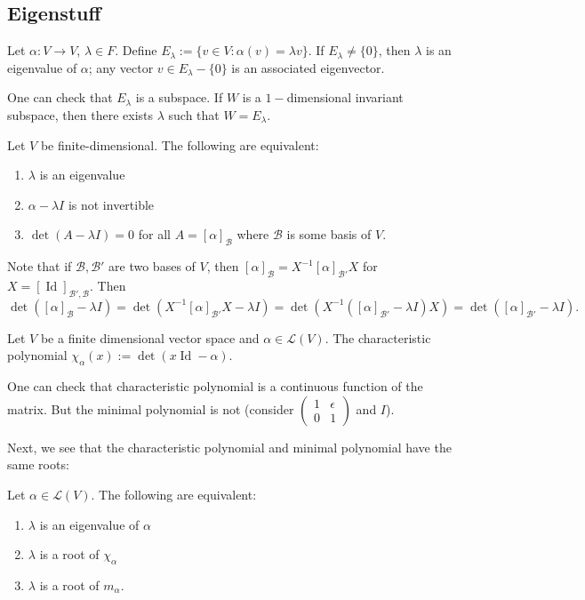 \documentclass{scrartcl}
\def\L{\mathcal{L}}
\def\B{\mathcal{B}}
\DeclareMathOperator{\id}{Id}
\begin{document}
\subsection{Eigenstuff}
\begin{definition}
	Let $\alpha: V \to V$, $\lambda \in F$. Define $E_\lambda := \{v \in V: \alpha(v) = \lambda v\}$. If $E_\lambda \ne \{0\}$, then $\lambda$ is an eigenvalue of $\alpha$; any vector $v \in E_\lambda-\{0\}$ is an associated eigenvector.
\end{definition}
One can check that $E_\lambda$ is a subspace. If $W$ is a $1-$dimensional invariant subspace, then there exists $\lambda$ such that $W = E_\lambda$. 
\begin{theorem}
	Let $V$ be finite-dimensional. The following are equivalent: 
	\begin{enumerate}
		\item $\lambda$ is an eigenvalue
		\item $\alpha - \lambda I$ is not invertible
		\item $\det(A-\lambda I) = 0$ for all $A = [\alpha]_\B$ where $\B$ is some basis of $V$.
	\end{enumerate}
\end{theorem}
\begin{remark}
	Note that if $\B, \B'$ are two bases of $V$, then $[\alpha]_\B = X^{-1}[\alpha]_{\B'}X$ for $X = [\id]_{\B', \B}$. Then
	\[\det([\alpha]_\B-\lambda I) = \det(X^{-1}[\alpha]_{\B'}X-\lambda I) =  \det(X^{-1}([\alpha]_{\B'}-\lambda I)X) = \det([\alpha]_{\B'}-\lambda I).\]%
\end{remark}
\begin{definition}
	Let $V$ be a finite dimensional vector space and $\alpha \in \L(V)$. The characteristic polynomial $\chi_\alpha(x) := \det(x\id-\alpha)$.
\end{definition}
\begin{remark}
	One can check that characteristic polynomial is a continuous function of the matrix. But the minimal polynomial is not (consider $\begin{pmatrix}
		1 & \epsilon \\
		0 & 1
	\end{pmatrix}$ and $I$). 
\end{remark}
Next, we see that the characteristic polynomial and minimal polynomial have the same roots:
\begin{proposition}
	Let $\alpha \in \L(V)$. The following are equivalent:
	\begin{enumerate}
		\item $\lambda$ is an eigenvalue of $\alpha$
		\item $\lambda$ is a root of $\chi_\alpha$
		\item $\lambda$ is a root of $m_\alpha$.
	\end{enumerate}
\end{proposition}
\end{document}
